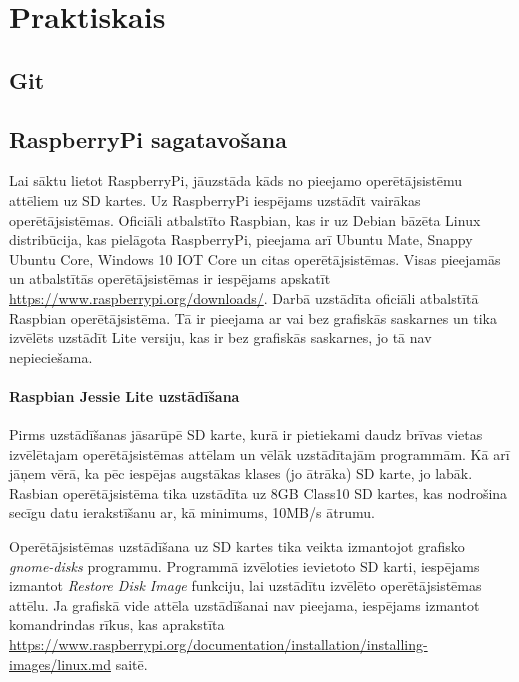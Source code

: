 \chapter{Praktiskais}

\section{Git}

\section{RaspberryPi sagatavošana}
Lai sāktu lietot RaspberryPi, jāuzstāda kāds no pieejamo operētājsistēmu attēliem uz SD kartes. Uz RaspberryPi iespējams uzstādīt vairākas operētājsistēmas. Oficiāli atbalstīto Raspbian, kas ir uz Debian bāzēta Linux distribūcija, kas pielāgota RaspberryPi, pieejama arī Ubuntu Mate, Snappy Ubuntu Core, Windows 10 IOT Core un citas operētājsistēmas. Visas pieejamās un atbalstītās operētājsistēmas ir iespējams apskatīt \url{https://www.raspberrypi.org/downloads/}.
Darbā uzstādīta oficiāli atbalstītā Raspbian operētājsistēma. Tā ir pieejama ar vai bez grafiskās saskarnes un tika izvēlēts uzstādīt Lite versiju, kas ir bez grafiskās saskarnes, jo tā nav nepieciešama.

\subsubsection{Raspbian Jessie Lite uzstādīšana}
Pirms uzstādīšanas jāsarūpē SD karte, kurā ir pietiekami daudz brīvas vietas izvēlētajam operētājsistēmas attēlam un vēlāk uzstādītajām programmām. Kā arī jāņem vērā, ka pēc iespējas augstākas klases (jo ātrāka) SD karte, jo labāk. Rasbian operētājsistēma tika uzstādīta uz 8GB Class10 SD kartes, kas nodrošina secīgu datu ierakstīšanu ar, kā minimums, 10MB/s ātrumu.

Operētājsistēmas uzstādīšana uz SD kartes tika veikta izmantojot grafisko \textit{gnome-disks} programmu. Programmā izvēloties ievietoto SD karti, iespējams izmantot \textit{Restore Disk Image} funkciju, lai uzstādītu izvēlēto operētājsistēmas attēlu.
Ja grafiskā vide attēla uzstādīšanai nav pieejama, iespējams izmantot komandrindas rīkus, kas aprakstīta \url{https://www.raspberrypi.org/documentation/installation/installing-images/linux.md} saitē.

